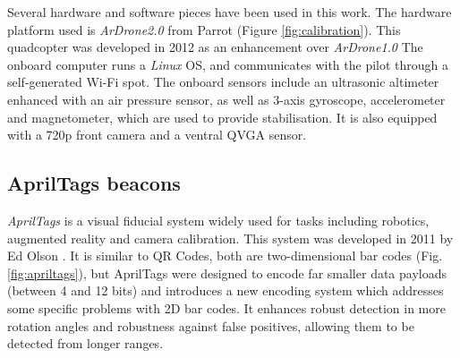 \documentclass{styles/svproc}
\begin{document}
Several hardware and software pieces have been used in this work.
	The hardware platform used is \textit{ArDrone2.0} from Parrot (Figure \ref{fig:calibration}). This quadcopter was developed in 2012 as an enhancement over \textit{ArDrone1.0} 
The onboard computer runs a \textit{Linux} OS, and communicates with the pilot through a self-generated Wi-Fi spot. The onboard sensors include an ultrasonic altimeter enhanced with an air pressure sensor, as well as 3-axis gyroscope, accelerometer and magnetometer, which are used to provide stabilisation. It is also equipped with a 720p front camera and a ventral QVGA sensor.
	

\subsection{AprilTags beacons}

	\textit{AprilTags} is a visual fiducial system widely used for tasks including robotics, augmented reality and camera calibration. This system was developed in 2011 by Ed Olson \cite{eolson}. It is similar to QR Codes, both are two-dimensional bar codes (Fig. \ref{fig:apriltags}), but AprilTags were designed to encode far smaller data payloads (between 4 and 12 bits) and introduces a new encoding system which addresses some specific problems with 2D bar codes. It enhances robust detection in more rotation angles and robustness against false positives, allowing them to be detected from longer ranges.
	
\end{document}
